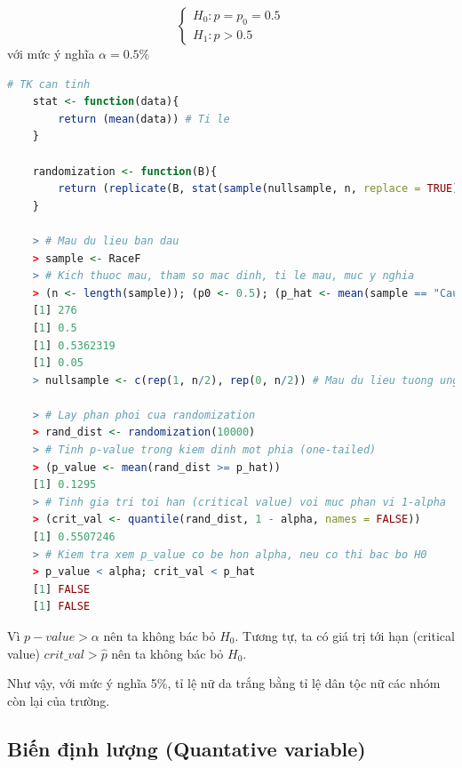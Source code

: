 \documentclass[a4paper,12pt]{article}
\begin{document}
	\begin{equation*}
	\begin{cases}
	H_0: p = p_0 = 0.5\\
	H_1: p > 0.5
	\end{cases}
	\end{equation*}
	với mức ý nghĩa $\alpha = 0.5\%$
	
	\begin{lstlisting}[language=R]
	# TK can tinh
	stat <- function(data){
		return (mean(data)) # Ti le
	}
	
	randomization <- function(B){
		return (replicate(B, stat(sample(nullsample, n, replace = TRUE))))
	}
	
	> # Mau du lieu ban dau
	> sample <- RaceF
	> # Kich thuoc mau, tham so mac dinh, ti le mau, muc y nghia
	> (n <- length(sample)); (p0 <- 0.5); (p_hat <- mean(sample == "Caucasian")); (alpha <- 0.05)
	[1] 276
	[1] 0.5
	[1] 0.5362319
	[1] 0.05
	> nullsample <- c(rep(1, n/2), rep(0, n/2)) # Mau du lieu tuong ung voi H0
	 
	> # Lay phan phoi cua randomization
	> rand_dist <- randomization(10000)
	> # Tinh p-value trong kiem dinh mot phia (one-tailed)
	> (p_value <- mean(rand_dist >= p_hat))
	[1] 0.1295
	> # Tinh gia tri toi han (critical value) voi muc phan vi 1-alpha
	> (crit_val <- quantile(rand_dist, 1 - alpha, names = FALSE))
	[1] 0.5507246
	> # Kiem tra xem p_value co be hon alpha, neu co thi bac bo H0
	> p_value < alpha; crit_val < p_hat
	[1] FALSE
	[1] FALSE
	\end{lstlisting}
	
	Vì $p-value > \alpha$ nên ta không bác bỏ $H_0$. Tương tự, ta có giá trị tới hạn (critical value) $crit\_val > \hat{p}$ nên ta không bác bỏ $H_0$. 
	
	Như vậy, với mức ý nghĩa 5\%, tỉ lệ nữ da trắng bằng tỉ lệ dân tộc nữ các nhóm còn lại của trường. 
		
	\subsection{Biến định lượng (Quantative variable)}
\end{document}
